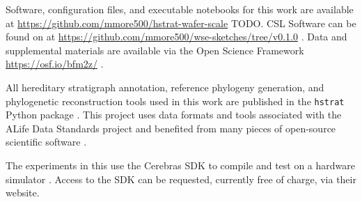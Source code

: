 Software, configuration files, and executable notebooks for this work are available at \url{https://github.com/mmore500/hstrat-wafer-scale} TODO.
CSL Software can be found on at \url{https://github.com/mmore500/wse-sketches/tree/v0.1.0} \citep{moreno2024wse}.
Data and supplemental materials are available via the Open Science Framework \url{https://osf.io/bfm2z/} \citep{foster2017open}.

All hereditary stratigraph annotation, reference phylogeny generation, and phylogenetic reconstruction tools used in this work are published in the \texttt{hstrat} Python package \citep{moreno2022hstrat}.
This project uses data formats and tools associated with the ALife Data Standards project \citep{lalejini2019data} and benefited from many pieces of open-source scientific software \citep{sand2014tqdist,2020SciPy-NMeth,harris2020array,reback2020pandas,mckinney-proc-scipy-2010,sukumaran2010dendropy,cock2009biopython,dolson2024phylotrackpy,torchiano2016effsize,waskom2021seaborn,hunter2007matplotlib,moreno2024apc,moreno2023teeplot,torchiano2016effsize,moreno2024pecking,moreno2024joinem,moreno2024hsurf}.

The experiments in this use the Cerebras SDK to compile and test on a hardware simulator \citep{TODOCITE}.
Access to the SDK can be requested, currently free of charge, via their website.

